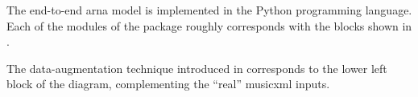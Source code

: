 
The end-to-end \gls{arna} model is implemented in the Python
programming language. Each of the modules of the package
roughly corresponds with the blocks shown in
.


The data-augmentation technique introduced in
corresponds to the lower left block of the diagram,
complementing the ``real'' \gls{musicxml} inputs.
